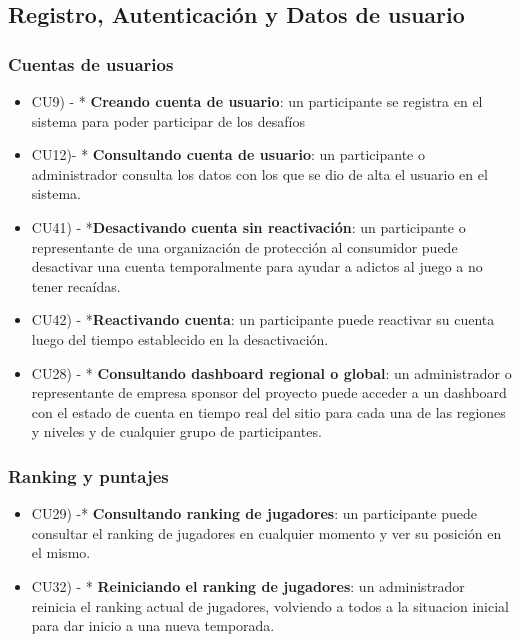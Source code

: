 \subsection{Registro, Autenticación y Datos de usuario}

\subsubsection{Cuentas de usuarios}
\begin{itemize}
\item CU9) - * \textbf{Creando cuenta de usuario}: un participante se registra en el sistema para poder participar de los desafíos

\item CU12)- * \textbf{Consultando cuenta de usuario}: un participante o administrador consulta los datos con los que se dio de alta el usuario en el sistema.

\item CU41) - *\textbf{Desactivando cuenta sin reactivación}: un participante o representante de una organización de protección al consumidor puede desactivar una cuenta temporalmente para ayudar a adictos al juego a no tener recaídas.

\item CU42) - *\textbf{Reactivando cuenta}: un participante puede reactivar su cuenta luego del tiempo establecido en la desactivación.

\item CU28) - * \textbf{Consultando dashboard regional o global}: un administrador o representante de empresa sponsor del proyecto puede acceder a un dashboard con el estado de cuenta en tiempo real del sitio para cada una de las regiones y niveles y de cualquier grupo de participantes.

\end{itemize}

\subsubsection{Ranking y puntajes}

\begin{itemize}
\item CU29) -* \textbf{Consultando ranking de jugadores}: un participante puede consultar el ranking de jugadores en cualquier momento y ver su posición en el mismo.

\item CU32) - * \textbf{Reiniciando el ranking de jugadores}: un administrador reinicia el ranking actual de jugadores, volviendo a todos a la situacion inicial para dar inicio a una nueva temporada.

\end{itemize}


